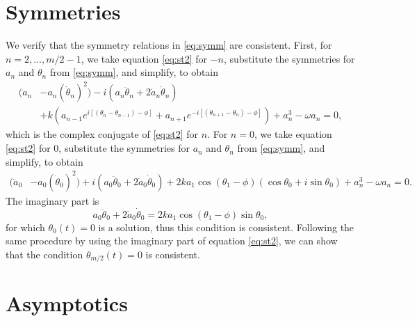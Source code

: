 \documentclass[11pt,reqno]{amsart}
\begin{document}
\appendix

\section{Symmetries}\label{app:symm}

We verify that the symmetry relations in \cref{eq:symm} are consistent. First, for $n = 2, \dots, m/2-1$, we take equation \cref{eq:st2} for $-n$, substitute the symmetries for $a_n$ and $\theta_n$ from \cref{eq:symm}, and simplify, to obtain 
\begin{equation*}
\begin{aligned}
(\ddot a_n &- a_n (\dot \theta_n)^2) 
- i ( a_n \ddot\theta_n + 2 \dot a_n \dot \theta_n )\\
&+ k\left(a_{n-1}e^{i[(\theta_n - \theta_{n-1}) - \phi]} + a_{n+1}e^{-i[(\theta_{n+1} - \theta_{n}) - \phi]} \right)+a_n^3 - \omega a_n = 0,
\end{aligned}
\end{equation*}	
which is the complex conjugate of \cref{eq:st2} for $n$. For $n = 0$, we take equation \cref{eq:st2} for $0$, substitute the symmetries for $a_n$ and $\theta_n$ from \cref{eq:symm}, and simplify, to obtain 
\begin{equation*}
\begin{aligned}
(\ddot a_0 &- a_0 (\dot \theta_0)^2) 
+ i ( a_0 \ddot\theta_0 + 2 \dot a_0 \dot \theta_0 )
+ 2 k a_1 \cos(\theta_1 - \phi)(\cos \theta_0 + i \sin \theta_0) + a_n^3 - \omega a_n = 0.
\end{aligned}
\end{equation*}
The imaginary part is
\begin{equation}\label{eq:n0imagpart}
a_0 \ddot\theta_0 + 2 \dot a_0 \dot \theta_0 = 2 k a_1 \cos(\theta_1 - \phi) \sin \theta_0,
\end{equation}
for which $\theta_0(t) = 0$ is a solution, thus this condition is consistent. Following the same procedure by using the imaginary part of equation \cref{eq:st2}, we can show that the condition $\theta_{m/2}(t) = 0$ is consistent.

\section{Asymptotics}
\end{document}
